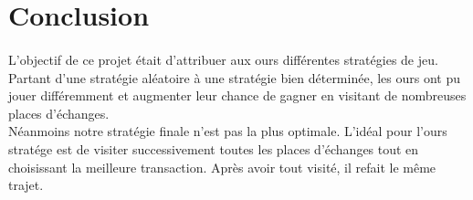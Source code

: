 \documentclass[a4paper,12pt]{article}
\begin{document}
\section{Conclusion}

\paragraph{}
L'objectif de ce projet était d'attribuer aux ours différentes stratégies de jeu. Partant d'une stratégie aléatoire à une stratégie bien déterminée, les ours ont pu jouer différemment et augmenter leur chance de gagner en visitant de nombreuses places d'échanges.\\
Néanmoins notre stratégie finale n'est pas la plus optimale. L'idéal pour l'ours stratége est de visiter successivement toutes les places d'échanges tout en choisissant la meilleure transaction. Après avoir tout visité, il refait le même trajet.
\end{document}
